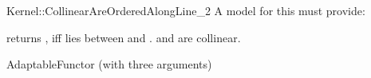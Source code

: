 \begin{ccRefFunctionObjectConcept}{Kernel::CollinearAreOrderedAlongLine_2}
A model for this must provide:


         {returns , iff  lies between  
          and . \ccPrecond {} and  are 
          collinear.}

\ccRefines
AdaptableFunctor (with three arguments)

\ccSeeAlso

 \\


\end{ccRefFunctionObjectConcept}
